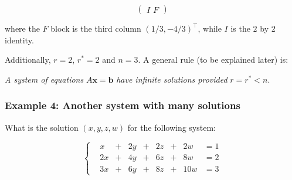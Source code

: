 \documentclass[
  letterpaper,
  DIV=11,
  numbers=noendperiod]{scrartcl}
\theoremstyle{definition}
\theoremstyle{remark}
\begin{document}
\[
\begin{pmatrix}I \,\,F\end{pmatrix}
\]

where the \(F\) block is the third column \((1/3, -4/3)^\intercal\),
while \(I\) is the \(2\) by \(2\) identity.

Additionally, \(r=2\), \(r^*=2\) and \(n=3\). A general rule (to be
explained later) is:

\emph{A system of equations} \(A\mathbf{x}=\mathbf{b}\) \emph{have
infinite solutions provided} \(r=r^*<n\).

\subsubsection{Example 4: Another system with many
solutions}\label{example-4-another-system-with-many-solutions}

What is the solution \((x,y, z, w)\) for the following system:

\[
\begin{cases}
&x&+ &2 y&+&2 z &+&2w &= 1\\
&2x&+&4y&+&6z&+&8w &= 2\\
&3x&+&6y&+&8z&+&10w &=3
\end{cases}
\]
\end{document}
